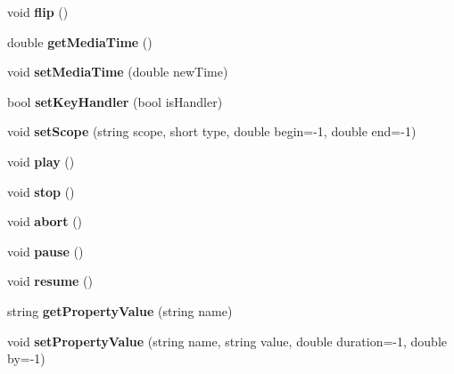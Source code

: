 \begin{CompactItemize}
\item 
void \textbf{flip} ()\label{classbr_1_1pucrio_1_1telemidia_1_1ginga_1_1ncl_1_1FormatterMediator_126cb0362ae2e7935520fb27343bad31}

\item 
double \textbf{getMediaTime} ()\label{classbr_1_1pucrio_1_1telemidia_1_1ginga_1_1ncl_1_1FormatterMediator_7824aad20f39c7c1878549d56addc656}

\item 
void \textbf{setMediaTime} (double newTime)\label{classbr_1_1pucrio_1_1telemidia_1_1ginga_1_1ncl_1_1FormatterMediator_78560e3e568205d1b7a40fc43db78f24}

\item 
bool \textbf{setKeyHandler} (bool isHandler)\label{classbr_1_1pucrio_1_1telemidia_1_1ginga_1_1ncl_1_1FormatterMediator_0e3bb20e5956653c0c0b112fb3b66a54}

\item 
void \textbf{setScope} (string scope, short type, double begin=-1, double end=-1)\label{classbr_1_1pucrio_1_1telemidia_1_1ginga_1_1ncl_1_1FormatterMediator_1950ca2b773826a9a8dc820e18faa92e}

\item 
void \textbf{play} ()\label{classbr_1_1pucrio_1_1telemidia_1_1ginga_1_1ncl_1_1FormatterMediator_6d58098c6cf63c241ed03bc797256bb1}

\item 
void \textbf{stop} ()\label{classbr_1_1pucrio_1_1telemidia_1_1ginga_1_1ncl_1_1FormatterMediator_8c528baf37154d347366083f0f816846}

\item 
void \textbf{abort} ()\label{classbr_1_1pucrio_1_1telemidia_1_1ginga_1_1ncl_1_1FormatterMediator_c54f53dc342019e8db34f4aa581a5792}

\item 
void \textbf{pause} ()\label{classbr_1_1pucrio_1_1telemidia_1_1ginga_1_1ncl_1_1FormatterMediator_7167f5c196fc5e167bfabde1a730e81d}

\item 
void \textbf{resume} ()\label{classbr_1_1pucrio_1_1telemidia_1_1ginga_1_1ncl_1_1FormatterMediator_41de8150eff044a237990c271d57ea27}

\item 
string \textbf{getPropertyValue} (string name)\label{classbr_1_1pucrio_1_1telemidia_1_1ginga_1_1ncl_1_1FormatterMediator_1d37ab97e0424d39fd0fc9e7a1913485}

\item 
void \textbf{setPropertyValue} (string name, string value, double duration=-1, double by=-1)\label{classbr_1_1pucrio_1_1telemidia_1_1ginga_1_1ncl_1_1FormatterMediator_c427e6845f7801bb2384ed0acc9d0987}


\end{CompactItemize}
